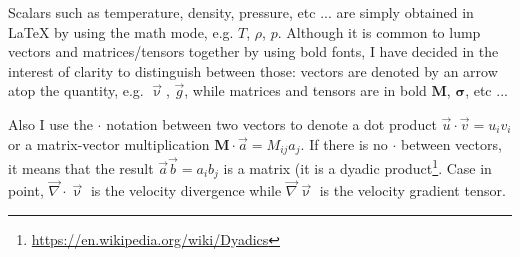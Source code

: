Scalars such as temperature, density, pressure, etc ... are simply 
obtained in \LaTeX{} by using the math mode, e.g. $T$, $\rho$, $p$.
Although it is common to lump vectors and matrices/tensors together
by using bold fonts, I have decided in the interest of clarity to 
distinguish between those: vectors are denoted by an arrow 
atop the quantity, e.g. $\vec \upnu$, $\vec g$, while matrices 
and tensors are in bold $\bm M$, $\bm \sigma$, etc ...

Also I use the $\cdot$ notation between two vectors to denote a 
dot product $\vec u \cdot \vec v = u_iv_i$ or a matrix-vector
multiplication ${\bm M}\cdot \vec a = M_{ij}a_j$. If there is no
$\cdot$ between vectors, it means that the result 
$\vec a \vec b = a_ib_j$ is a matrix (it is a dyadic 
product\footnote{\url{https://en.wikipedia.org/wiki/Dyadics}}.
Case in point, $\vec\nabla\cdot\vec\upnu$ is the velocity divergence
while $\vec\nabla\vec\upnu$ is the velocity gradient tensor.

